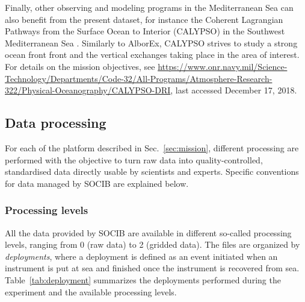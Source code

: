 \documentclass[essd,manuscript]{copernicus}
\begin{document}
Finally, other observing and modeling programs in the Mediterranean Sea can also benefit from the present dataset, for instance the Coherent Lagrangian Pathways from the Surface Ocean to Interior (CALYPSO) in the Southwest Mediterranean Sea \citep{JOHNSTON2018}. Similarly to AlborEx, CALYPSO strives to study a strong ocean front front and the vertical exchanges taking place in the area of interest. For details on the mission objectives, see \url{https://www.onr.navy.mil/Science-Technology/Departments/Code-32/All-Programs/Atmosphere-Research-322/Physical-Oceanography/CALYPSO-DRI}, last accessed December 17, 2018.

\subsection{Data processing\label{sec:processing}}

For each of the platform described in Sec.~\ref{sec:mission}, different processing are performed with the objective to turn raw data into quality-controlled, standardised data directly usable by scientists and experts. Specific conventions for data managed by SOCIB are explained below.

\subsubsection{Processing levels}

All the data provided by SOCIB are available in different so-called processing levels, ranging from 0 (raw data) to 2 (gridded data). The files are organized by \textit{deployments}, where a deployment is defined as an event initiated when an instrument is put at sea and finished once the instrument is recovered from sea. Table~\ref{tab:deployment} summarizes the deployments performed during the experiment and the available processing levels.
\end{document}
